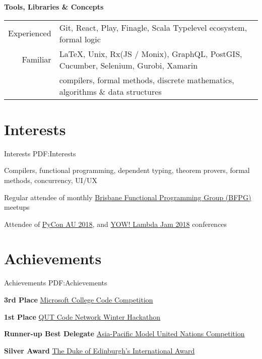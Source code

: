 \documentclass[a4paper,10pt,oneside]{article}
\begin{document}
\begin{body}
\EntryGap
\EntryGap
\EntryGap

\textbf{Tools, Libraries \& Concepts}

\par
\begin{tabular}{rl}
\par Experienced & Git, React, Play, Finagle, Scala Typelevel ecosystem, formal logic\\
\par Familiar & \LaTeX, Unix, Rx(JS / Monix), GraphQL, PostGIS, Cucumber, Selenium, Gurobi, Xamarin\\
& compilers, formal methods, discrete mathematics, algorithms \& data structures\\
\end{tabular}

\section
{Interests}
{Interests}
{PDF:Interests}

\par Compilers, functional programming, dependent typing, theorem provers, formal methods, concurrency, UI/UX
\par Regular attendee of monthly \href{https://www.meetup.com/en-AU/Brisbane-Functional-Programming-Group/}{Brisbane Functional Programming Group (BFPG)} meetups
\par Attendee of \href{https://2018.pycon-au.org/}{PyCon AU 2018}, and \href{http://lambdajam.yowconference.com.au/}
{YOW! Lambda Jam 2018} conferences


\section
{Achievements}
{Achievements}
{PDF:Achievements}

\par \textbf{3rd Place}
\href{https://msft3c.com/}{Microsoft College Code Competition}
\hfill {}

\par \textbf{1st Place}
\href{https://codenetwork.co/hackathon-2017/}{QUT Code Network Winter Hackathon}
\hfill {}

\par \textbf{Runner-up Best Delegate}
\href{http://www.amunc.net/}{Asia-Pacific Model United Nations Competition} 
\hfill {}

\par \textbf{Silver Award}
\href{http://www.dukeofed.com.au/}{The Duke of Edinburgh’s International Award}
\hfill {}


\end{body}
\end{document}
